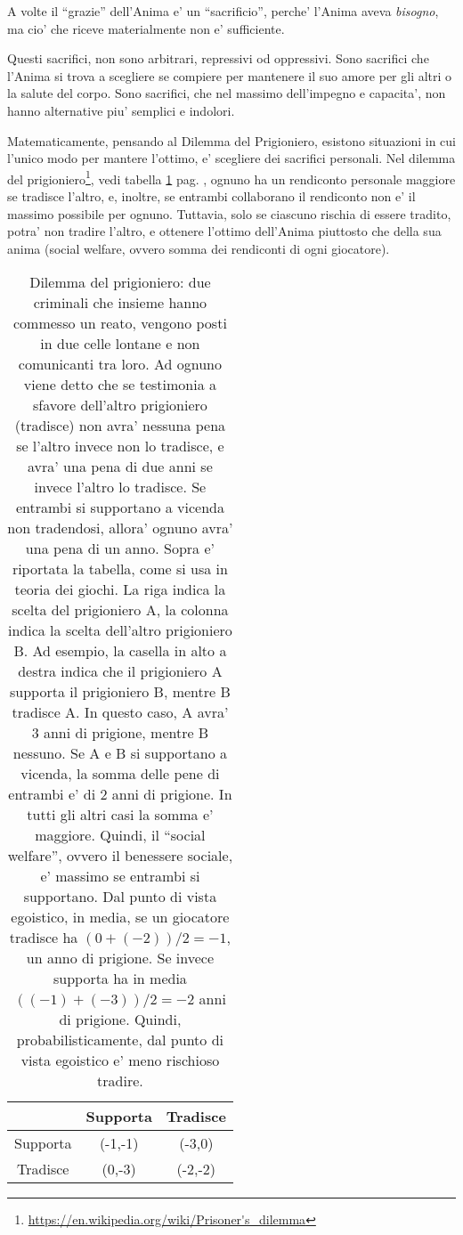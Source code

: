 A volte il ``grazie'' dell'Anima e' un ``sacrificio'', perche' l'Anima aveva \emph{bisogno}, ma cio' che riceve materialmente non e' sufficiente.

Questi sacrifici, non sono arbitrari, repressivi od oppressivi. Sono sacrifici che l'Anima si trova a scegliere se compiere per mantenere il suo amore per gli altri o la salute del corpo. Sono sacrifici, che nel massimo dell'impegno e capacita', non hanno alternative piu' semplici e indolori.

Matematicamente, pensando al Dilemma del Prigioniero, esistono situazioni in cui l'unico modo per mantere l'ottimo, e' scegliere dei sacrifici personali. Nel dilemma del prigioniero\footnote{\url{https://en.wikipedia.org/wiki/Prisoner's\_dilemma}}, vedi tabella \ref{tabPrisonerDilemma} pag. \pageref{tabPrisonerDilemma}, ognuno ha un rendiconto personale maggiore se tradisce l'altro, e, inoltre, se entrambi collaborano il rendiconto non e' il massimo possibile per ognuno. Tuttavia, solo se ciascuno rischia di essere tradito, potra' non tradire l'altro, e ottenere l'ottimo dell'Anima piuttosto che della sua anima (social welfare, ovvero somma dei rendiconti di ogni giocatore).

\begin{center}
    \begin{table}
        \begin{tabular}{ |c|c|c| }
            \hline
            &  Supporta   &   Tradisce \\
            \hline
            Supporta   & (-1,-1) & (-3,0) \\
            \hline
            Tradisce & (0,-3) & (-2,-2) \\
            \hline
        \end{tabular}
        \caption{\label{tabPrisonerDilemma}Dilemma del prigioniero: due criminali che insieme hanno commesso un reato, vengono posti in due celle lontane e non comunicanti tra loro. Ad ognuno viene detto che se testimonia a sfavore dell'altro prigioniero (tradisce) non avra' nessuna pena se l'altro invece non lo tradisce, e avra' una pena di due anni se invece l'altro lo tradisce. Se entrambi si supportano a vicenda non tradendosi, allora' ognuno avra' una pena di un anno. Sopra e' riportata la tabella, come si usa in teoria dei giochi. La riga indica la scelta del prigioniero A, la colonna indica la scelta dell'altro prigioniero B. Ad esempio, la casella in alto a destra indica che il prigioniero A supporta il prigioniero B, mentre B tradisce A. In questo caso, A avra' 3 anni di prigione, mentre B nessuno. Se A e B si supportano a vicenda, la somma delle pene di entrambi e' di 2 anni di prigione. In tutti gli altri casi la somma e' maggiore. Quindi, il ``social welfare'', ovvero il benessere sociale, e' massimo se entrambi si supportano. Dal punto di vista egoistico, in media, se un giocatore tradisce ha $(0+(-2))/2 = -1$, un anno di prigione. Se invece supporta ha in media $((-1)+(-3))/2=-2$ anni di prigione. Quindi, probabilisticamente, dal punto di vista egoistico e' meno rischioso tradire. }

    \end{table}
\end{center}

